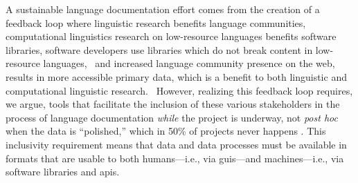 \documentclass[11pt]{article}
\newcommand{\smalltodo}[2][]
    {\todo[caption={#2}, #1]
    {\tiny#2\normalsize}}
\begin{document}
A sustainable language documentation effort comes from the creation of a
feedback loop where linguistic research benefits language communities,
computational linguistics research on low-resource languages benefits software
libraries, software developers use libraries which do not break content in
low-resource languages,
~and increased language community presence on the web,  results in more
accessible primary data, which is a benefit to both linguistic and computational
linguistic research.%
~However, realizing this feedback loop requires, we argue, tools that facilitate
the inclusion of these various stakeholders in the process of language documentation
\emph{while} the project is underway, not \emph{post hoc} when the data is ``polished,''
which in 50\% of projects never happens \cite{Thieberger:2012}. This
inclusivity requirement means that data and data processes must be available in
formats that are usable to both humans---i.e., via \glspl{gui}---and machines---i.e.,
via software libraries and \glspl{api}.
\end{document}
